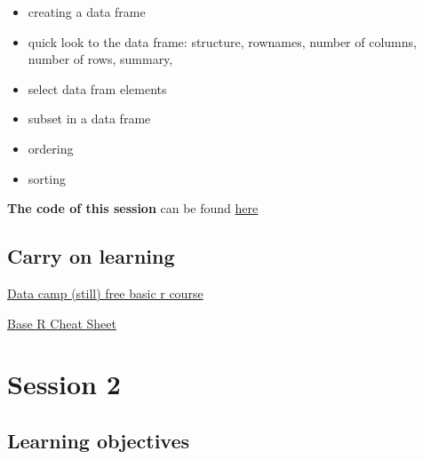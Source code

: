 \documentclass[]{book}
\providecommand{\tightlist}{%
  \setlength{\itemsep}{0pt}\setlength{\parskip}{0pt}}
\theoremstyle{definition}
\theoremstyle{definition}
\theoremstyle{definition}
\theoremstyle{remark}
\begin{document}
\begin{itemize}
  \begin{itemize}
  \tightlist
  \item
    creating a data frame
  \item
    quick look to the data frame: structure, rownames, number of
    columns, number of rows, summary,
  \item
    select data fram elements
  \item
    subset in a data frame
  \item
    ordering
  \item
    sorting
  \end{itemize}
\end{itemize}

\textbf{The code of this session} can be found
\href{https://github.com/oldiya/DataScience/blob/master/scripts/session1.R}{here}

\hypertarget{carry-on-learning}{%
\subsection{Carry on learning}\label{carry-on-learning}}

\href{https://www.datacamp.com/courses/free-introduction-to-r?utm_source=adwords_ppc\&utm_campaignid=898687156\&utm_adgroupid=48303643819\&utm_device=c\&utm_keyword=\&utm_matchtype=b\&utm_network=g\&utm_adpostion=1t1\&utm_creative=229335520231\&utm_targetid=dsa-377762271983\&utm_loc_interest_ms=\&utm_loc_physical_ms=1005620\&gclid=EAIaIQobChMIkOeW3InG2QIVdijTCh23qgmmEAAYASAAEgIJL_D_BwE}{Data
camp (still) free basic r course}

\href{https://www.rstudio.com/wp-content/uploads/2016/10/r-cheat-sheet-3.pdf}{Base
R Cheat Sheet}

\hypertarget{session-2}{%
\section{Session 2}\label{session-2}}

\hypertarget{learning-objectives-1}{%
\subsection{Learning objectives}\label{learning-objectives-1}}
\end{document}
